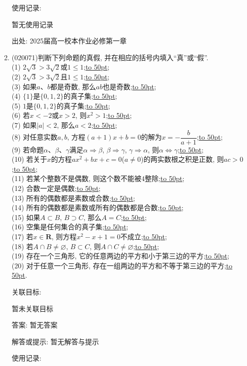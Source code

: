 \documentclass[10pt,a4paper]{article}
\newcommand{\blank}[1]{\underline{\hbox to #1pt{}}}
\begin{document}
\begin{enumerate}[1.]
使用记录:

暂无使用记录


出处: 2025届高一校本作业必修第一章
\item { (020071)}判断下列命题的真假, 并在相应的括号内填入``真''或``假''.\\
(1) $2\sqrt 3>3\sqrt 2$或$1\le 1$;\blank{50};\\
(2) $2\sqrt 3>3\sqrt 2$且$1\le1$;\blank{50};\\
(3) 如果$a$、$b$都是奇数, 那么$ab$也是奇数;\blank{50};\\
(4) $\{1\}$是$\{0, 1, 2\}$的真子集;\blank{50};\\
(5) $1$是$\{0, 1, 2\}$的真子集;\blank{50};\\
(6) 若$x<-2$或$x>2$, 则$x^2>1$;\blank{50};\\
(7) 如果$|a|<2$, 那么$a<2$;\blank{50};\\
(8) 对任意实数$a,b$, 方程$(a+1)x+b=0$的解为$x=-\dfrac b{a+1}$;\blank{50};\\
(9) 若命题$\alpha$、$\beta$、$\gamma$满足$\alpha\Rightarrow \beta$, $\beta\Rightarrow \gamma$, $\gamma\Rightarrow \alpha$, 则$\alpha\Leftrightarrow \gamma$;\blank{50};\\
(10) 若关于$x$的方程$ax^2+bx+c=0$($a\ne 0$)的两实数根之积是正数, 则$ac>0$;\blank{50};\\
(11) 若某个整数不是偶数, 则这个数不能被$4$整除;\blank{50};\\
(12) 合数一定是偶数;\blank{50};\\
(13) 所有的偶数都是素数或合数;\blank{50};\\
(14) 所有的偶数都是素数或所有的偶数都是合数;\blank{50};\\
(15) 如果$A\subset B$, $B\supset C$, 那么$A=C$;\blank{50};\\
(16) 空集是任何集合的真子集;\blank{50};\\
(17) 若$x\in \mathbf{R}$, 则方程$x^2-x+1=0$不成立;\blank{50};\\
(18) 若$A\cap B\ne \varnothing$, $B\subset C$, 则$A\cap C\ne \varnothing$;\blank{50};\\
(19) 存在一个三角形, 它的任意两边的平方和小于第三边的平方;\blank{50};\\
(20) 对于任意一个三角形, 存在一组两边的平方和不等于第三边的平方;\blank{50}.


关联目标:

暂未关联目标

答案: 暂无答案

解答或提示: 暂无解答与提示

使用记录:


\end{enumerate}
\end{document}
